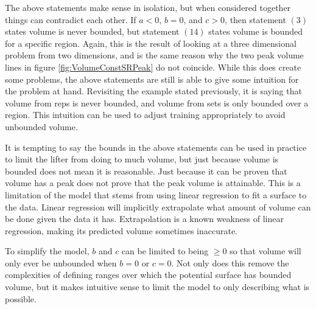The above statements make sense in isolation, but when considered together things can contradict each other. If $a<0$, $b=0$, and $c>0$, then  statement $(3)$ states volume is never bounded, but statement $(14)$ states volume is bounded for a specific region. Again, this is the result of looking at a three dimensional problem from two dimensions, and is the same reason why the two peak volume lines in figure \ref{fig:VolumeConstSRPeak} do not coincide. While this does create some problems, the above statements are still is able to give some intuition for the problem at hand. Revisiting the example stated previously, it is saying that volume from reps is never bounded, and volume from sets is only bounded over a region. This intuition can be used to adjust training appropriately to avoid unbounded volume.

It is tempting to say the bounds in the above statements can be used in practice to limit the lifter from doing to much volume, but just because volume is bounded does not mean it is reasonable. Just because it can be proven that volume has a peak does not prove that the peak volume is attainable. This is a limitation of the model that stems from using linear regression to fit a surface to the data. Linear regression will implicitly extrapolate what amount of volume can be done given the data it has. Extrapolation is a known weakness of linear regression, making its predicted volume sometimes inaccurate.

To simplify the model, $b$ and $c$ can be limited to being $\ge 0$ so that volume will only ever be unbounded when $b=0$ or $c=0$. Not only does this remove the complexities of defining ranges over which the potential surface has bounded volume, but it makes intuitive sense to limit the model to only describing what is possible.



